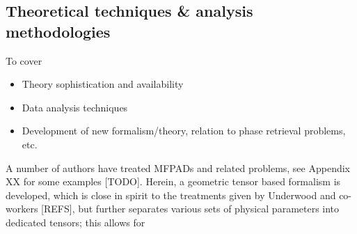 \subsection{Theoretical techniques \& analysis methodologies}

To cover 

\begin{itemize}
\item Theory sophistication and availability
\item Data analysis techniques
\item Development of new formalism/theory, relation to phase retrieval problems, etc.
\end{itemize}

A number of authors have treated MFPADs and related problems, see Appendix XX for some examples [TODO]. Herein, a geometric tensor based formalism is developed, which is close in spirit to the treatments given by Underwood and co-workers [REFS], but further separates various sets of physical parameters into dedicated tensors; this allows for 